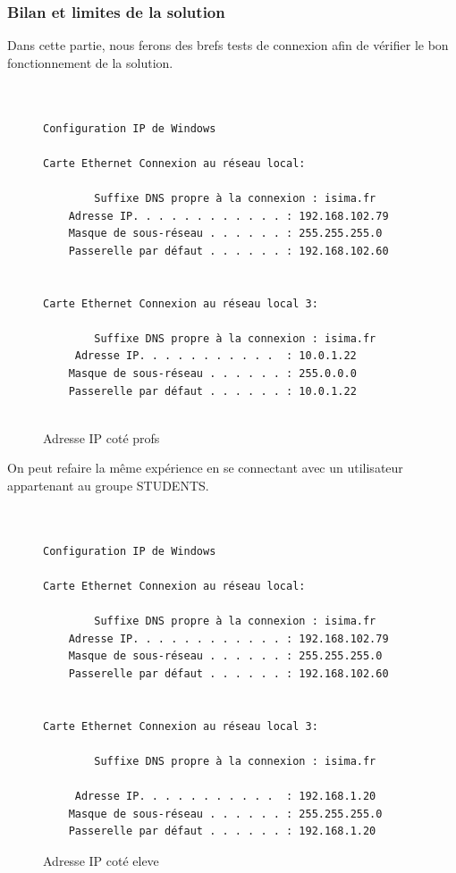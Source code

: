 \subsubsection{Bilan et limites de la solution}

Dans cette partie, nous ferons des brefs tests de connexion afin de vérifier le bon fonctionnement de la solution.


\begin{figure}[H]
	\begin{center}
		\begin{minipage}{1\textwidth}
			\begin{lstlisting}[frame=trBL]


Configuration IP de Windows

Carte Ethernet Connexion au réseau local:

        Suffixe DNS propre à la connexion : isima.fr
	Adresse IP. . . . . . . . . . . . : 192.168.102.79
	Masque de sous-réseau . . . . . . : 255.255.255.0
	Passerelle par défaut . . . . . . : 192.168.102.60


Carte Ethernet Connexion au réseau local 3:

        Suffixe DNS propre à la connexion : isima.fr
	 Adresse IP. . . . . . . . . . .  : 10.0.1.22
	Masque de sous-réseau . . . . . . : 255.0.0.0
	Passerelle par défaut . . . . . . : 10.0.1.22


			\end{lstlisting}
		\end{minipage}
	\end{center}
	\caption{Adresse IP coté profs}
	\label{Adresse_IP_cote_profs}
\end{figure}


On peut refaire la même expérience en se connectant avec un utilisateur appartenant au groupe STUDENTS.

\begin{figure}[H]
	\begin{center}
		\begin{minipage}{1\textwidth}
			\begin{lstlisting}[frame=trBL]


Configuration IP de Windows

Carte Ethernet Connexion au réseau local:

        Suffixe DNS propre à la connexion : isima.fr
	Adresse IP. . . . . . . . . . . . : 192.168.102.79
	Masque de sous-réseau . . . . . . : 255.255.255.0
	Passerelle par défaut . . . . . . : 192.168.102.60


Carte Ethernet Connexion au réseau local 3:

        Suffixe DNS propre à la connexion : isima.fr
       
	 Adresse IP. . . . . . . . . . .  : 192.168.1.20
	Masque de sous-réseau . . . . . . : 255.255.255.0
	Passerelle par défaut . . . . . . : 192.168.1.20

\end{lstlisting}
		\end{minipage}
	\end{center}
	\caption{Adresse IP coté eleve}
	\label{Adresse_IP_cote_eleve}
\end{figure}

